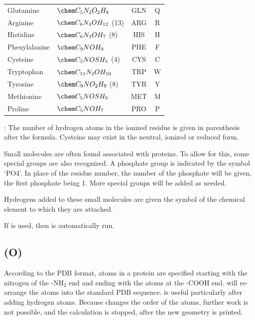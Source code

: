 \begin{table}
\begin{center}
\begin{tabular}{llcc}
Glutamine       & $\chem C_5N_2O_2H_8$           & GLN           & Q  \\
Arginine        & $\chem C_6N_4OH_{12}$ (13)& ARG           & R  \\
Histidine       & $\chem C_6N_3OH_7$ (8)      & HIS           & H  \\
Phenylalanine   & $\chem C_9NOH_9$               & PHE           & F  \\
Cysteine        & $\chem C_3NOSH_5$ (4)        & CYS           & C  \\
Tryptophan      & $\chem C_{11}N_2OH_{10}$       & TRP           & W  \\
Tyrosine        & $\chem C_9NO_2H_9$ (8)      & TYR           & Y  \\
Methionine      & $\chem C_5NOSH_9$              & MET           & M  \\
Proline         & $\chem C_5NOH_7$               & PRO           & P  \\
\hline
\end{tabular}

\dag : The number of hydrogen atoms in the ionized residue is given in
parenthesis after the formula.  Cysteine may exist in the neutral,
ionized or reduced form.
\end{center}
\end{table}

Small molecules are often found associated with proteins. To allow for
this, some special groups are also recognized. A phosphate group is indicated by
the symbol `PO4'.  In place of the residue number, the number of the
phosphate will be given, the first phosphate being 1.  More special groups
will be added as needed.

Hydrogens added to these small molecules are given the symbol of the chemical
element to which they are attached.

If  is used, then  is automatically run.


\subsection*{ (O)}
According to the PDB format, atoms in a protein are specified starting with
the nitrogen of the -NH$_2$ end and ending with the atoms at the -COOH end.
 will re-arrange the atoms into the standard PDB sequence.
 is useful particularly after adding hydrogen atoms.  Because
 changes the order of the atoms, further work is not
possible, and the calculation is stopped, after the new geometry is printed.

